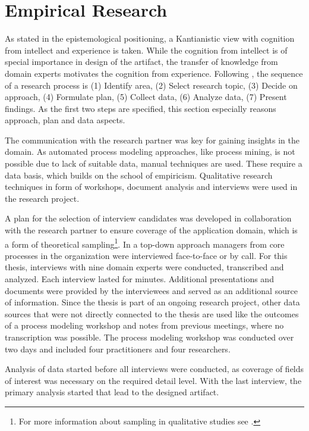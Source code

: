 	
	\section{Empirical Research}
	As stated in the epistemological positioning, a Kantianistic view with cognition from intellect and experience is taken. While the cognition from intellect is of special importance in design of the artifact, the transfer of knowledge from domain experts motivates the cognition from experience. 
	Following \cite{gilljohnson}, the sequence of a research process is (1) Identify area, (2) Select research topic, (3) Decide on approach, (4) Formulate plan, (5) Collect data, (6) Analyze data, (7) Present findings. As the first two steps are specified, this section especially reasons approach, plan and data aspects. 
	
	The communication with the research partner was key for gaining insights in the domain. As automated process modeling approaches, like process mining, is not possible due to lack of suitable data, manual techniques are used. These require a data basis, which builds on the school of empiricism. Qualitative research techniques in form of workshops, document analysis and interviews were used in the research project. 
	
	A plan for the selection of interview candidates was developed in collaboration with the research partner to ensure coverage of the application domain, which is a form of theoretical sampling\footnote{For more information about sampling in qualitative studies see \citep{coyne1997sampling}.}. In a top-down approach managers from core processes in the organization were interviewed face-to-face or by call. For this thesis, interviews with nine domain experts were conducted, transcribed and analyzed. Each interview lasted for  minutes. Additional presentations and documents were provided by the interviewees and served as an additional source of information. Since the thesis is part of an ongoing research project, other data sources that were not directly connected to the thesis are used like the outcomes of a process modeling workshop and notes from previous meetings, where no transcription was possible. The process modeling workshop was conducted over two days and included four practitioners and four researchers. 
	
	Analysis of data started before all interviews were conducted, as coverage of fields of interest was necessary on the required detail level. With the last interview, the primary analysis started that lead to the designed artifact.
	
	
	
